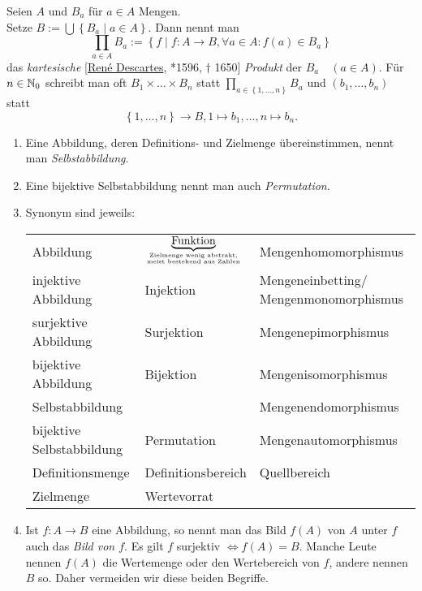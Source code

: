 \documentclass[../../main.tex]{subfiles}
\begin{document}
\begin{df}\label{1.1.28}
Seien $A$ und $B_a$ für $a\in A$ Mengen.\\
Setze $B:=\bigcup\left\{B_a\mid a\in A\right\}$. Dann nennt man 
$$\prod_{a\in A} B_a := \left\{f\mid f:A\rightarrow B, \forall a\in A: f(a) \in B_a\right\}$$
das \emph{kartesische} [\href{http://de.wikipedia.org/wiki/René_Descartes}{René Descartes}, *1596, $\dagger$ 1650] \emph{Produkt} der $B_a\quad (a\in A)$. Für $n\in\mathbb N_0$ schreibt man oft $B_1\times\ldots\times B_n$ statt $\prod_{a\in\left\{1,\ldots,n\right\}}B_a$ und $(b_1,\ldots,b_n)$ statt
\[\left\{1,\ldots,n\right\}\rightarrow B, 1\mapsto b_1,\ldots, n\mapsto b_n.\]
\end{df}

\begin{spr}\label{1.1.29}
\begin{enumerate}[\normalfont(a)]
\item Eine Abbildung, deren Definitions- und Zielmenge übereinstimmen, nennt man \emph{Selbstabbildung}.
\item Eine bijektive Selbstabbildung nennt man auch \emph{Permutation}.
\item Synonym sind jeweils:\\
\begin{tabular}{p{}p{}p{}}
Abbildung & $\underbrace{\text{Funktion}}_{\over{\text{Zielmenge wenig abstrakt,}}{\text{meist bestehend aus Zahlen}}}$ & Mengenhomomorphismus \\
injektive Abbildung & Injektion & Mengeneinbetting/ Mengenmonomorphismus \\
surjektive Abbildung & Surjektion & Mengenepimorphismus\\
bijektive Abbildung & Bijektion & Mengenisomorphismus \\
Selbstabbildung & & Mengenendomorphismus \\
bijektive Selbstabbildung & Permutation & Mengenautomorphismus \\
Definitionsmenge & Definitionsbereich & Quellbereich \\
Zielmenge & Wertevorrat &
\end{tabular}
\item Ist $f:A\rightarrow B$ eine Abbildung, so nennt man das Bild $f(A)$ von $A$ unter $f$ auch das \emph{Bild von $f$}. Es gilt $f$ surjektiv $\iff f(A) = B$.
Manche Leute nennen $f(A)$ die Wertemenge oder den Wertebereich von $f$, andere nennen $B$ so. Daher vermeiden wir diese beiden Begriffe.
\end{enumerate}
\end{spr}
\end{document}

